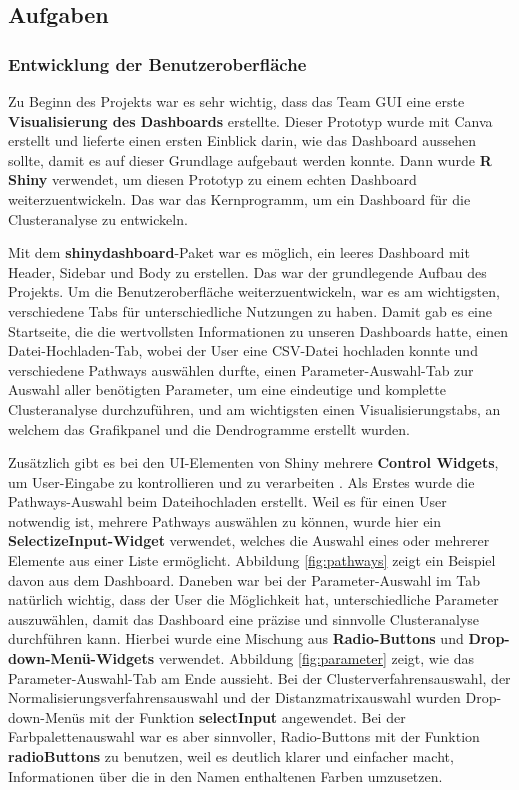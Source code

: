 \documentclass[12pt]{article}
\begin{document}
\newpage
\subsection{Aufgaben}
\label{wichtigeAufgaben}

\subsubsection{Entwicklung der Benutzeroberfläche}

Zu Beginn des Projekts war es sehr wichtig, dass das Team GUI eine erste \textbf{Visualisierung des Dashboards} erstellte. Dieser Prototyp wurde mit Canva erstellt und lieferte einen ersten Einblick darin, wie das Dashboard aussehen sollte, damit es auf dieser Grundlage aufgebaut werden konnte. Dann wurde \textbf{R Shiny} verwendet, um diesen Prototyp zu einem echten Dashboard weiterzuentwickeln. Das war das Kernprogramm, um ein Dashboard für die Clusteranalyse zu entwickeln.

Mit dem \textbf{shinydashboard}-Paket war es möglich, ein leeres Dashboard mit Header, Sidebar und Body zu erstellen. Das war der grundlegende Aufbau des Projekts. Um die Benutzeroberfläche weiterzuentwickeln, war es am wichtigsten, verschiedene Tabs für unterschiedliche Nutzungen zu haben. Damit gab es eine Startseite, die die wertvollsten Informationen zu unseren Dashboards hatte, einen Datei-Hochladen-Tab, wobei der User eine CSV-Datei hochladen konnte und verschiedene Pathways auswählen durfte, einen Parameter-Auswahl-Tab zur Auswahl aller benötigten Parameter, um eine eindeutige und komplette Clusteranalyse durchzuführen, und am wichtigsten einen Visualisierungstabs, an welchem das Grafikpanel und die Dendrogramme erstellt wurden. 

Zusätzlich gibt es bei den UI-Elementen von Shiny mehrere \textbf{Control Widgets}, um User-Eingabe zu kontrollieren und zu verarbeiten \cite{ControlWidgets}. Als Erstes wurde die Pathways-Auswahl beim Dateihochladen erstellt. Weil es für einen User notwendig ist, mehrere Pathways auswählen zu können, wurde hier ein \textbf{SelectizeInput-Widget} verwendet, welches die Auswahl eines oder mehrerer Elemente aus einer Liste ermöglicht. Abbildung \ref{fig:pathways} zeigt ein Beispiel davon aus dem Dashboard. Daneben war bei der Parameter-Auswahl im Tab natürlich wichtig, dass der User die Möglichkeit hat, unterschiedliche Parameter auszuwählen, damit das Dashboard eine präzise und sinnvolle Clusteranalyse durchführen kann. Hierbei wurde eine Mischung aus \textbf{Radio-Buttons} und \textbf{Drop-down-Menü-Widgets} verwendet. Abbildung \ref{fig:parameter} zeigt, wie das Parameter-Auswahl-Tab am Ende aussieht. Bei der Clusterverfahrensauswahl, der Normalisierungsverfahrensauswahl und der Distanzmatrixauswahl wurden Drop-down-Menüs mit der Funktion \textbf{selectInput} angewendet. Bei der Farbpalettenauswahl war es aber sinnvoller, Radio-Buttons mit der Funktion \textbf{radioButtons} zu benutzen, weil es deutlich klarer und einfacher macht, Informationen über die in den Namen enthaltenen Farben umzusetzen.
\end{document}
